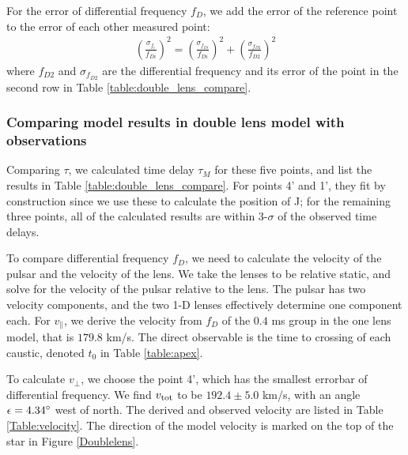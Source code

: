 \documentclass[useAMS,usenatbib]{mn2e}
\begin{document}
For the error of differential frequency $f_D$, we add the error of the
reference point to the error of each other measured point:
\begin{equation}
\begin{aligned}
(\frac{\sigma_{f_i}}{f_{Di}})^2=(\frac{\sigma_{f_{Di}}}{f_{Di}})^2+(\frac{\sigma_{f_{D2}}}{f_{D2}})^2
\end{aligned}
\end{equation}
where $f_{D2}$ and $\sigma_{f_{D2}}$ are the differential frequency
and its error of the point in the second row in Table
\ref{table:double_lens_compare}.

\subsubsection{Comparing model results in double lens model with observations}
Comparing $\tau$, we calculated time delay $\tau_M$ for these five
points, and list the results in Table
\ref{table:double_lens_compare}. For points 4' and 1', they fit by
construction since we use these to calculate the position of J; for the remaining three points, all of the calculated results are within 3-$\sigma$ of the observed time delays.

To compare differential frequency $f_D$, we need to calculate the
velocity of the pulsar and the velocity of the lens. We take the
lenses to be relative static, and solve for the velocity of the pulsar
relative to the lens.  The pulsar has two velocity components, and the
two 1-D lenses effectively determine one component each.
For $v_{\parallel}$, we derive the velocity from $f_D$ of the $0.4$ ms
group in the one lens model, that is $179.8$ km/s.  The direct
observable is the time to crossing of each caustic, denoted $t_0$ in
Table \ref{table:apex}. 

To calculate $v_{\bot}$, we choose the point 4', which has the smallest
errorbar of differential frequency.
We find $v_{\rm tot}$ to be $192.4\pm 5.0$ km/s,
with an angle $\epsilon=4.34\degree$ west of north. The derived and
observed velocity are listed in Table \ref{Table:velocity}. The
direction of the model velocity is marked on the top of the star in
Figure \ref{Doublelens}.
\end{document}
